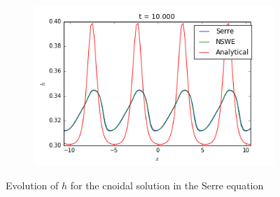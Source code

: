 \begin{figure}[h!]
\begin{subfigure}{.3\linewidth}
	\end{subfigure}
	\begin{subfigure}{.3\linewidth}
		\includegraphics[scale=.3]{figures/Serre/cnoidal3h.png}	
	\end{subfigure}
	\caption{Evolution of $h$ for the cnoidal solution in the Serre equation \label{fig:cnoidalh}}
\end{figure}

